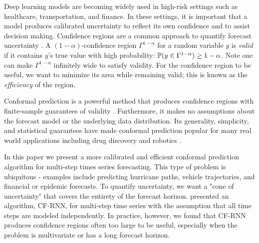 Deep learning  models are becoming widely used in high-risk settings such as healthcare, transportation, and finance. In these settings, it is important that a model produces calibrated uncertainty to reflect its own confidence and to assist decision making. Confidence regions are a common approach to quantify forecast uncertainty \cite{khosravi2011comprehensive}. A $(1-\alpha)$-confidence region $\Gamma^{1-\alpha}$ for a random variable $y$ is \textit{valid} if it contains $y$'s true value with high probability:  ${\mathbb{P}}(y \in \Gamma^{1-\alpha}) \geq 1-\alpha$. Note one can make  $\Gamma^{1-\alpha}$ infinitely wide to satisfy validity. For the confidence region to be useful, we want to minimize its area while remaining valid; this is known as the \textit{efficiency} of the region. 

Conformal prediction is a powerful method that produces confidence regions with finite-sample guarantees of validity  \cite{vovk2005algorithmic, lei2018distribution}. Furthermore, it makes no assumptions about the forecast model or the underlying data distribution. Its generality, simplicity, and statistical guarantees have made conformal prediction popular for many real world applications including drug discovery \cite{eklund2015application} and robotics \cite{luo2021sample}.

In this paper we present a more calibrated and efficient conformal prediction algorithm for multi-step times series forecasting. This type of problem is ubiquitous - examples include predicting hurricane paths, vehicle trajectories, and financial or epidemic forecasts. To quantify uncertainty, we want a "cone of uncertainty" that covers the entirety of the forecast horizon. \cite{Schaar2021conformaltime} presented an algorithm, CF-RNN, for multi-step time series with the assumption that all time steps are modeled independently. In practice, however, we found that CF-RNN produces confidence regions often too large to be useful, especially when the problem is multivariate or has a long forecast horizon. 


